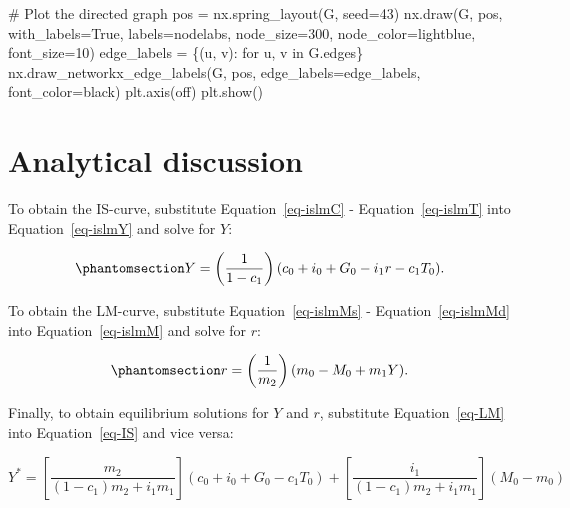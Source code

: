 \documentclass[
  letterpaper,
  DIV=11,
  numbers=noendperiod]{scrreprt}
\newenvironment{Shaded}{\begin{snugshade}}{\end{snugshade}}
\newcommand{\CommentTok}[1]{\textcolor[rgb]{0.37,0.37,0.37}{#1}}
\newcommand{\ControlFlowTok}[1]{\textcolor[rgb]{0.00,0.23,0.31}{#1}}
\newcommand{\DecValTok}[1]{\textcolor[rgb]{0.68,0.00,0.00}{#1}}
\newcommand{\KeywordTok}[1]{\textcolor[rgb]{0.00,0.23,0.31}{#1}}
\newcommand{\NormalTok}[1]{\textcolor[rgb]{0.00,0.23,0.31}{#1}}
\newcommand{\OperatorTok}[1]{\textcolor[rgb]{0.37,0.37,0.37}{#1}}
\newcommand{\StringTok}[1]{\textcolor[rgb]{0.13,0.47,0.30}{#1}}
\newcommand{\VariableTok}[1]{\textcolor[rgb]{0.07,0.07,0.07}{#1}}
\begin{document}
\begin{tcolorbox}
\begin{Shaded}
\begin{Highlighting}[]
\CommentTok{\# Plot the directed graph}
\NormalTok{pos }\OperatorTok{=}\NormalTok{ nx.spring\_layout(G, seed}\OperatorTok{=}\DecValTok{43}\NormalTok{)  }
\NormalTok{nx.draw(G, pos, with\_labels}\OperatorTok{=}\VariableTok{True}\NormalTok{, labels}\OperatorTok{=}\NormalTok{nodelabs, node\_size}\OperatorTok{=}\DecValTok{300}\NormalTok{, node\_color}\OperatorTok{=}\StringTok{\textquotesingle{}lightblue\textquotesingle{}}\NormalTok{, }
\NormalTok{        font\_size}\OperatorTok{=}\DecValTok{10}\NormalTok{)}
\NormalTok{edge\_labels }\OperatorTok{=}\NormalTok{ \{(u, v): }\StringTok{\textquotesingle{}\textquotesingle{}} \ControlFlowTok{for}\NormalTok{ u, v }\KeywordTok{in}\NormalTok{ G.edges\}}
\NormalTok{nx.draw\_networkx\_edge\_labels(G, pos, edge\_labels}\OperatorTok{=}\NormalTok{edge\_labels, font\_color}\OperatorTok{=}\StringTok{\textquotesingle{}black\textquotesingle{}}\NormalTok{)}
\NormalTok{plt.axis(}\StringTok{\textquotesingle{}off\textquotesingle{}}\NormalTok{)}
\NormalTok{plt.show()}
\end{Highlighting}
\end{Shaded}

\end{tcolorbox}

\section{Analytical discussion}\label{analytical-discussion}

To obtain the IS-curve, substitute Equation~\ref{eq-islmC} -
Equation~\ref{eq-islmT} into Equation~\ref{eq-islmY} and solve for
\(Y\):

\begin{equation}\phantomsection\label{eq-IS}{
Y=\left(\frac{1}{1-c_1}\right)(c_0 + i_0 + G_0 - i_1r - c_1 T_0).
}\end{equation}

To obtain the LM-curve, substitute Equation~\ref{eq-islmMs} -
Equation~\ref{eq-islmMd} into Equation~\ref{eq-islmM} and solve for
\(r\):

\begin{equation}\phantomsection\label{eq-LM}{
r=\left(\frac{1}{m_2}\right)(m_0 - M_0 + m_1Y).
}\end{equation}

Finally, to obtain equilibrium solutions for \(Y\) and \(r\), substitute
Equation~\ref{eq-LM} into Equation~\ref{eq-IS} and vice versa:

\[
Y^*=\left[\frac{m_2}{(1-c_1)m_2+i_1m_1}\right](c_0 + i_0 + G_0 - c_1 T_0) + \left[\frac{i_1}{(1-c_1)m_2+i_1m_1}\right](M_0-m_0)
\]
\end{document}
